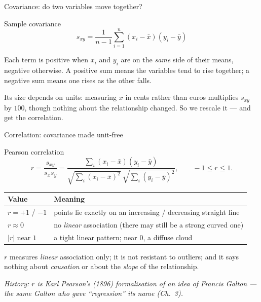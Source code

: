 \documentclass[aspectratio=169,11pt]{beamer}
\begin{document}
\begin{frame}{Covariance: do two variables move together?}
  \begin{block}{Sample covariance}
    \[
      s_{xy} = \frac{1}{n-1}\sum_{i=1}^{n}(x_i - \bar x)(y_i - \bar y)
    \]
  \end{block}
  \begin{readme}
    Each term is positive when $x_i$ and $y_i$ are on the \emph{same} side of
    their means, negative otherwise. A positive sum means the variables tend
    to rise together; a negative sum means one rises as the other falls.
  \end{readme}
  \begin{takeaway}
    Its size depends on units: measuring $x$ in cents rather than euros
    multiplies $s_{xy}$ by $100$, though nothing about the relationship
    changed. So we rescale it --- and get the correlation.
  \end{takeaway}
\end{frame}

\begin{frame}{Correlation: covariance made unit-free}
  \begin{block}{Pearson correlation}
    \[
      r = \frac{s_{xy}}{s_x s_y}
        = \frac{\sum_i (x_i-\bar x)(y_i-\bar y)}
               {\sqrt{\sum_i (x_i-\bar x)^2}\ \sqrt{\sum_i (y_i-\bar y)^2}},
      \qquad -1 \le r \le 1 .
    \]
  \end{block}
  \footnotesize
  \begin{tabular}{@{}ll@{}}
    \toprule
    \textbf{Value} & \textbf{Meaning} \\
    \midrule
    $r = +1$ / $-1$ & points lie exactly on an increasing / decreasing straight line \\
    $r \approx 0$ & no \emph{linear} association (there may still be a strong curved one) \\
    $|r|$ near $1$ & a tight linear pattern; near $0$, a diffuse cloud \\
    \bottomrule
  \end{tabular}
  \begin{takeaway}
    $r$ measures \emph{linear} association only; it is not resistant to
    outliers; and it says nothing about \emph{causation} or about the
    \emph{slope} of the relationship.
  \end{takeaway}
  \par{\tiny\itshape\color{gray}History: $r$ is Karl Pearson's (1896)
  formalisation of an idea of Francis Galton --- the same Galton who gave
  ``regression'' its name (Ch.~3).}
\end{frame}
\end{document}
